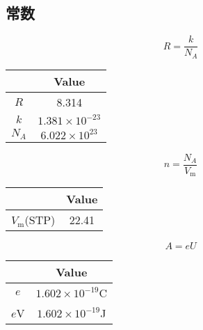 \documentclass[10pt]{article}
\numberwithin{equation}{section}
\begin{document}
\begin{multicols}{3}
\begin{CJK}{UTF8}{song}
\section{常数}
\begin{equation}
  R=\frac{k}{N_A}
\end{equation}
\begin{center}
\begin{tabular}{cc}
  \hline
   & Value \\
  \hline
  $R$ & 8.314\\
  $k$ & $1.381\times 10^{-23}$\\
  $N_A$ & $6.022\times 10^{23}$ \\
  \hline
\end{tabular}
\end{center}
\begin{equation}
  n=\frac{N_A}{V_{\textrm{m}}}
\end{equation}
\begin{center}
\begin{tabular}{cc}
  \hline
   & Value \\
  \hline
  $V_{\textrm{m}}$(STP) & 22.41\\
  \hline
\end{tabular}
\end{center}
\begin{equation}
  A=eU
\end{equation}
\begin{center}
\begin{tabular}{cc}
  \hline
   & Value \\
  \hline
  $e$ & $1.602\times 10^{-19}$C\\
  $e$V & $1.602\times 10^{-19}$J\\
  \hline
\end{tabular}
\end{center}
\end{CJK}
\end{multicols}
\end{document}
